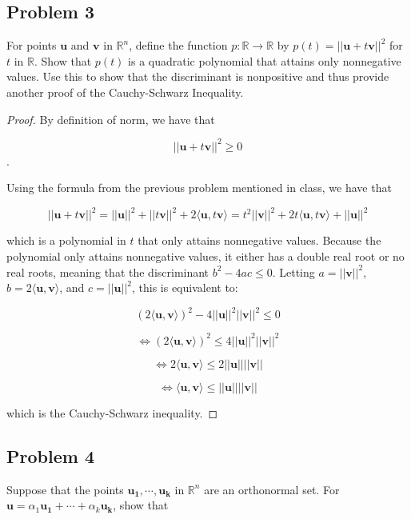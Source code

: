 \documentclass{article}
\begin{document}
\subsection*{Problem 3}
For points $\textbf{u}$ and $\textbf{v}$ in $\mathbb{R}^n$, define the function $p \colon \mathbb{R} \to \mathbb{R}$ by $p(t) = ||\textbf{u} + t\textbf{v}||^2$ for $t$ in $\mathbb{R}$. Show that $p(t)$ is a quadratic polynomial that attains only nonnegative values. Use this to show that the discriminant is nonpositive and thus provide another proof of the Cauchy-Schwarz Inequality.

\begin{proof}

By definition of norm, we have that

\[ ||\textbf{u} + t\textbf{v}||^2 \geq 0\].

Using the formula from the previous problem mentioned in class, we have that

\[ ||\textbf{u} + t\textbf{v}||^2 = ||\textbf{u}||^2 + ||t\textbf{v}||^2 + 2\langle \textbf{u}, t\textbf{v} \rangle = t^2||\textbf{v}||^2 + 2t\langle \textbf{u}, t\textbf{v} \rangle + ||\textbf{u}||^2\]

which is a polynomial in $t$ that only attains nonnegative values. Because the polynomial only attains nonnegative values, it either has a double real root or no real roots, meaning that the discriminant $b^2 - 4ac \leq 0$. Letting $a=||\textbf{v}||^2$, $b=2\langle \textbf{u}, \textbf{v}\rangle$, and $c=||\textbf{u}||^2$, this is equivalent to:

\[(2\langle \textbf{u}, \textbf{v}\rangle)^2 - 4||\textbf{u}||^2||\textbf{v}||^2 \leq 0\]

\[ \iff (2\langle \textbf{u}, \textbf{v}\rangle)^2 \leq 4||\textbf{u}||^2||\textbf{v}||^2\]

\[ \iff 2\langle \textbf{u}, \textbf{v}\rangle \leq 2||\textbf{u}||||\textbf{v}||\]

\[ \iff \langle \textbf{u}, \textbf{v}\rangle \leq ||\textbf{u}||||\textbf{v}||\]

which is the Cauchy-Schwarz inequality.

\end{proof}

\subsection*{Problem 4}
Suppose that the points $\mathbf{u_1}, \cdots, \mathbf{u_k}$ in $\mathbb{R}^n$ are an orthonormal set. For $\mathbf{u} = \alpha_1\mathbf{u_1} + \cdots + \alpha_k\mathbf{u_k}$, show that
\end{document}
